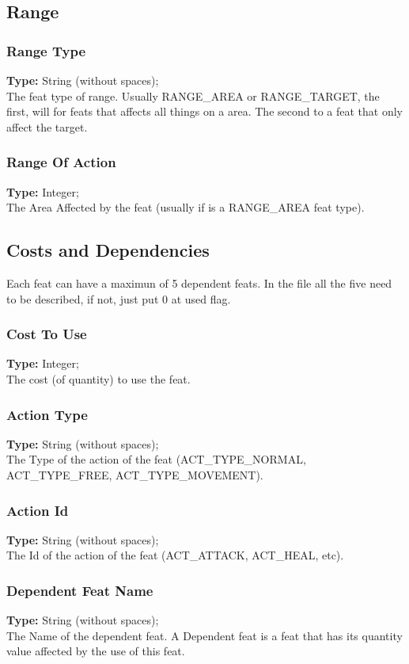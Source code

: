 \documentclass[letterpaper,12pt]{article}
\begin{document}
\subsection{Range}

\subsubsection{Range Type}
{\bf Type:} String (without spaces);\\ 
The feat type of range. Usually RANGE\_AREA or RANGE\_TARGET, the first, will
for feats that affects all things on a area. The second to a feat that only
affect the target.

\subsubsection{Range Of Action}
{\bf Type:} Integer;\\
The Area Affected by the feat (usually if is a RANGE\_AREA feat type).

\subsection{Costs and Dependencies}

Each feat can have a maximun of 5 dependent feats. In the file all the five
need to be described, if not, just put 0 at used flag.

\subsubsection{Cost To Use}
{\bf Type:} Integer;\\
The cost (of quantity) to use the feat.

\subsubsection{Action Type}
{\bf Type:} String (without spaces);\\
The Type of the action of the feat (ACT\_TYPE\_NORMAL, ACT\_TYPE\_FREE,
ACT\_TYPE\_MOVEMENT).

\subsubsection{Action Id}
{\bf Type:} String (without spaces);\\
The Id of the action of the feat (ACT\_ATTACK, ACT\_HEAL, etc).

\subsubsection{Dependent Feat Name}
{\bf Type:} String (without spaces);\\
The Name of the dependent feat. A Dependent feat is a feat that has its
quantity value affected by the use of this feat.
\end{document}
